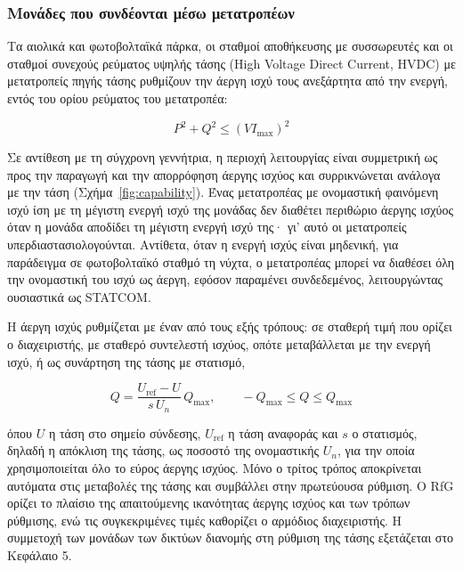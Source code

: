 \subsubsection{Μονάδες που συνδέονται μέσω μετατροπέων}
\label{sec:conv}

Τα αιολικά και φωτοβολταϊκά πάρκα, οι σταθμοί αποθήκευσης με συσσωρευτές και οι σταθμοί
συνεχούς ρεύματος υψηλής τάσης (High Voltage Direct Current, HVDC) με μετατροπείς πηγής τάσης
ρυθμίζουν την άεργη ισχύ τους ανεξάρτητα από την ενεργή, εντός του ορίου ρεύματος του
μετατροπέα:

\begin{equation}
P^2 + Q^2 \le \left(V I_{\max}\right)^2
\label{eq:conv-limit}
\end{equation}

Σε αντίθεση με τη σύγχρονη γεννήτρια, η περιοχή λειτουργίας είναι συμμετρική ως προς την
παραγωγή και την απορρόφηση άεργης ισχύος και συρρικνώνεται ανάλογα με την τάση
(Σχήμα~\ref{fig:capability}). Ένας μετατροπέας με ονομαστική φαινόμενη ισχύ ίση με τη μέγιστη
ενεργή ισχύ της μονάδας δεν διαθέτει περιθώριο άεργης ισχύος όταν η μονάδα αποδίδει τη
μέγιστη ενεργή ισχύ της· γι' αυτό οι μετατροπείς υπερδιαστασιολογούνται. Αντίθετα, όταν η
ενεργή ισχύς είναι μηδενική, για παράδειγμα σε φωτοβολταϊκό σταθμό τη νύχτα, ο μετατροπέας
μπορεί να διαθέσει όλη την ονομαστική του ισχύ ως άεργη, εφόσον παραμένει συνδεδεμένος,
λειτουργώντας ουσιαστικά ως STATCOM.

Η άεργη ισχύς ρυθμίζεται με έναν από τους εξής τρόπους: σε σταθερή τιμή που ορίζει ο
διαχειριστής, με σταθερό συντελεστή ισχύος, οπότε μεταβάλλεται με την ενεργή ισχύ, ή ως
συνάρτηση της τάσης με στατισμό,

\begin{equation}
Q = \frac{U_{\mathrm{ref}} - U}{s\,U_n}\,Q_{\max}, \qquad -Q_{\max} \le Q \le Q_{\max}
\label{eq:qu}
\end{equation}

όπου $U$ η τάση στο σημείο σύνδεσης, $U_{\mathrm{ref}}$ η τάση αναφοράς και $s$ ο στατισμός,
δηλαδή η απόκλιση της τάσης, ως ποσοστό της ονομαστικής $U_n$, για την οποία
χρησιμοποιείται όλο το εύρος άεργης ισχύος. Μόνο ο τρίτος τρόπος αποκρίνεται αυτόματα στις
μεταβολές της τάσης και συμβάλλει στην πρωτεύουσα ρύθμιση. Ο RfG ορίζει το πλαίσιο της
απαιτούμενης ικανότητας άεργης ισχύος και των τρόπων ρύθμισης, ενώ τις συγκεκριμένες τιμές
καθορίζει ο αρμόδιος διαχειριστής. Η συμμετοχή των μονάδων των δικτύων διανομής στη ρύθμιση
της τάσης εξετάζεται στο Κεφάλαιο 5.

